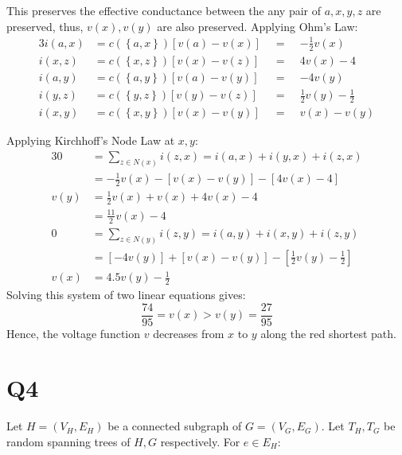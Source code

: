 \documentclass[a4paper, 11pt]{article}
\def\set#1{\left\{ #1 \right\}}
\begin{document}
This preserves the effective conductance between the any pair of $a,x,y,z$ are preserved, thus, $v(x),v(y)$ are also preserved. Applying Ohm's Law: 
\begin{alignat*}{3}
	i(a,x) &= c(\set{a,x})\left[v(a)-v(x)\right] &\;\;=\;\;& -\frac 12v(x)        \\
	i(x,z) &= c(\set{x,z})\left[v(x)-v(z)\right] &\;\;=\;\;& 4v(x)-4              \\
	i(a,y) &= c(\set{a,y})\left[v(a)-v(y)\right] &\;\;=\;\;& -4v(y)               \\
	i(y,z) &= c(\set{y,z})\left[v(y)-v(z)\right] &\;\;=\;\;& \frac 12v(y)-\frac12 \\
	i(x,y) &= c(\set{x,y})\left[v(x)-v(y)\right] &\;\;=\;\;& v(x)-v(y)            
\end{alignat*}

Applying Kirchhoff's Node Law at $x,y$: 
\begin{alignat*}{3}
	     0 &= \sum_{z\in N(x)}i(z,x) = i(a,x)+i(y,x)+i(z,x) \\
	       &= -\frac 12v(x) - [v(x)-v(y)]- [4v(x)-4]        \\
	  v(y) &= \frac 12v(x) + v(x) + 4v(x)-4                 \\
	       &= \frac {11}2v(x)-4                             \\
	     0 &= \sum_{z\in N(y)}i(z,y) = i(a,y)+i(x,y)+i(z,y) \\
		   &=  \left[ -4v(y) \right]
		      +\left[ v(x)-v(y) \right]
		      -\left[ \frac 12 v(y) - \frac 12 \right]      \\
	  v(x) &= 4.5v(y) - \frac 12 
\end{alignat*}
Solving this system of two linear equations gives: 
\[
	\frac{74}{95}=v(x) > v(y)=\frac{27}{95}
\]
Hence, the voltage function $v$ decreases from $x$ to $y$ along the red shortest path.

\pagebreak
\section*{Q4}
Let $H=(V_H,E_H)$ be a connected subgraph of $G=(V_G,E_G)$. Let $T_H,T_G$ be random spanning trees of $H,G$ respectively. For $e\in E_H$:
\end{document}
